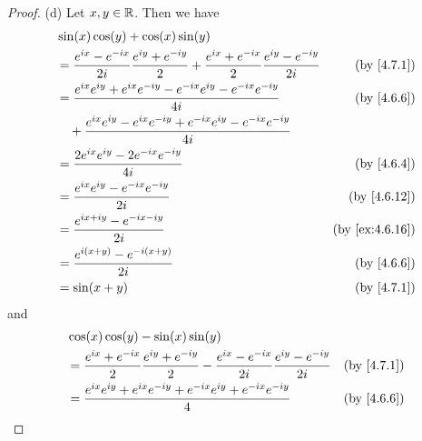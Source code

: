 \begin{proof}{(d)}
  Let \(x, y \in \mathbb{R}\).
  Then we have
  \begin{align*}
     & \sin(x) \cos(y) + \cos(x) \sin(y)                                                                                                                             \\
     & = \frac{e^{i x} - e^{- i x}}{2 i} \frac{e^{i y} + e^{- i y}}{2} + \frac{e^{i x} + e^{- i x}}{2} \frac{e^{i y} - e^{- i y}}{2i} & \text{(by \cref{4.7.1})}     \\
     & = \frac{e^{i x} e^{i y} + e^{i x} e^{- i y} - e^{- i x} e^{i y} - e^{- i x} e^{- i y}}{4i}                                     & \text{(by \cref{4.6.6})}     \\
     & \quad + \frac{e^{i x} e^{i y} - e^{i x} e^{- i y} + e^{- i x} e^{i y} - e^{- i x} e^{- i y}}{4i}                                                              \\
     & = \frac{2 e^{i x} e^{i y} - 2 e^{- i x} e^{- i y}}{4i}                                                                         & \text{(by \cref{4.6.4})}     \\
     & = \frac{e^{i x} e^{i y} - e^{- i x} e^{- i y}}{2i}                                                                             & \text{(by \cref{4.6.12})}    \\
     & = \frac{e^{i x + i y} - e^{- i x - i y}}{2i}                                                                                   & \text{(by \cref{ex:4.6.16})} \\
     & = \frac{e^{i (x + y)} - e^{- i (x + y)}}{2i}                                                                                   & \text{(by \cref{4.6.6})}     \\
     & = \sin(x + y)                                                                                                                  & \text{(by \cref{4.7.1})}
  \end{align*}
  and
  \begin{align*}
     & \cos(x) \cos(y) - \sin(x) \sin(y)                                                                                                                            \\
     & = \frac{e^{i x} + e^{- i x}}{2} \frac{e^{i y} + e^{- i y}}{2} - \frac{e^{i x} - e^{- i x}}{2i} \frac{e^{i y} - e^{- i y}}{2i} & \text{(by \cref{4.7.1})}     \\
     & = \frac{e^{i x} e^{i y} + e^{i x} e^{- i y} + e^{- i x} e^{i y} + e^{- i x} e^{- i y}}{4}                                     & \text{(by \cref{4.6.6})}     \\

\end{align*}
\end{proof}

